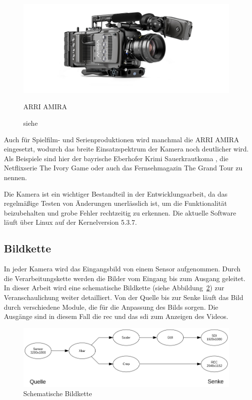 \begin{figure}[!hbtp]
	\centering
	\includegraphics[width = 0.7\linewidth]{pictures/amira-product-image-data.jpg}
	\hspace*{0\textwidth}
	\caption{ARRI AMIRA}
	\caption*{siehe \cite{arriamira_bild}}
	\label{fig:amira}
\end{figure}  

Auch für Spielfilm- und Serienproduktionen wird  manchmal die \ac{ARRI} AMIRA eingesetzt, wodurch das breite Einsatzspektrum der Kamera noch deutlicher wird.
Als Beispiele sind hier der bayrische Eberhofer Krimi \glqq Sauerkrautkoma\grqq{} \cite{arrikrimi}, die Netflixserie \glqq The Ivory Game\grqq{} \cite{imdbivory} oder auch das Fernsehmagazin \glqq The Grand Tour\grqq{} \cite{imdbtour} zu nennen.
 
Die Kamera ist ein wichtiger Bestandteil in der Entwicklungsarbeit, da das regelmäßige Testen von Änderungen unerlässlich ist, um die Funktionalität beizubehalten und grobe Fehler rechtzeitig zu erkennen. Die aktuelle Software läuft über Linux auf der Kernelversion 5.3.7.

\subsection{Bildkette}\label{sec:bildkette}
In jeder Kamera wird das Eingangsbild von einem Sensor aufgenommen. Durch die Verarbeitungskette werden die Bilder vom Eingang bis zum Ausgang geleitet. In dieser Arbeit wird eine schematische Bildkette (siehe Abbildung~\ref{fig:bild}) zur Veranschaulichung weiter detailliert. Von der Quelle bis zur Senke läuft das Bild durch verschiedene Module, die für die Anpassung des Bilds sorgen. Die Ausgänge sind in diesem Fall die \ac{rec} und das \ac{sdi} zum Anzeigen des Videos.

\begin{figure}[!hbtp]
	\centering
	\includegraphics[width = \linewidth]{pictures/2020-10-01-Bildkette_ohne.png}
	\smallskip
	\caption{Schematische Bildkette}
	\label{fig:bild}
\end{figure} 


